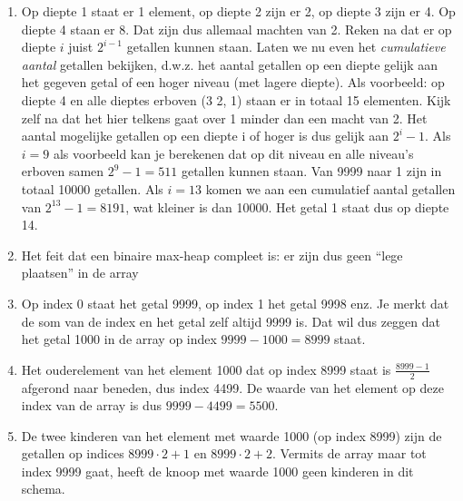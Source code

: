 \begin{Oplossing}{6.6}
\begin{enumerate}
\item Op diepte 1 staat er 1 element, op diepte 2 zijn er 2, op diepte 3 zijn er 4. Op diepte 4 staan er 8. Dat zijn dus allemaal machten van 2. Reken na dat er op diepte $i$ juist $2^{i-1}$ getallen kunnen staan. Laten we nu even het \emph{cumulatieve aantal} getallen bekijken, d.w.z. het aantal getallen op een diepte gelijk aan het gegeven getal of een hoger niveau (met lagere diepte). Als voorbeeld: op diepte 4 en alle dieptes erboven (3 2, 1) staan er in totaal 15 elementen. Kijk zelf na dat het hier telkens gaat over 1 minder dan een macht van 2. Het aantal mogelijke getallen op een diepte i of hoger is dus gelijk aan $2^i - 1$. Als $i=9$ als voorbeeld kan je berekenen dat op dit niveau en alle niveau's erboven samen $2^9 - 1 = 511$ getallen kunnen staan. Van 9999 naar 1 zijn in totaal 10000 getallen. Als $i=13$ komen we aan een cumulatief aantal getallen van $2^{13}-1=8191$, wat kleiner is dan 10000. Het getal 1 staat dus op diepte 14.

\item Het feit dat een binaire max-heap compleet is: er zijn dus geen “lege plaatsen” in de array

\item Op index 0 staat het getal 9999, op index 1 het getal 9998 enz. Je merkt dat de som van de index en het getal zelf altijd 9999 is. Dat wil dus zeggen dat het getal 1000 in de array op index $9999-1000=8999$ staat.

\item Het ouderelement van het element 1000 dat op index 8999 staat is $\frac{8999-1}{2}$ afgerond naar beneden, dus index 4499. De waarde van het element op deze index van de array is dus $9999-4499=5500$.

\item De twee kinderen van het element met waarde 1000 (op index 8999) zijn de getallen op indices $8999\cdot 2 + 1$ en $8999\cdot 2 + 2$. Vermits de array maar tot index 9999 gaat, heeft de knoop met waarde 1000 geen kinderen in dit schema.
\end{enumerate}
\end{Oplossing}

